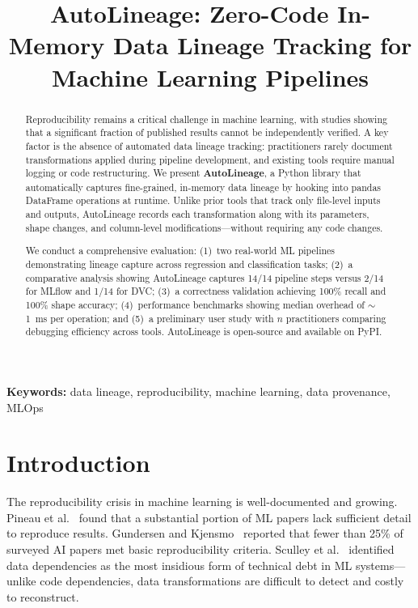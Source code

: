 \documentclass[10pt,twocolumn]{article}
\title{AutoLineage: Zero-Code In-Memory Data Lineage Tracking for Machine Learning Pipelines}
\author{}
\date{}
\begin{document}
\maketitle

\begin{abstract}
Reproducibility remains a critical challenge in machine learning, with studies showing that a significant fraction of published results cannot be independently verified. A key factor is the absence of automated data lineage tracking: practitioners rarely document transformations applied during pipeline development, and existing tools require manual logging or code restructuring. We present \textbf{AutoLineage}, a Python library that automatically captures fine-grained, in-memory data lineage by hooking into pandas DataFrame operations at runtime. Unlike prior tools that track only file-level inputs and outputs, AutoLineage records each transformation along with its parameters, shape changes, and column-level modifications---without requiring any code changes.

We conduct a comprehensive evaluation: (1)~two real-world ML pipelines demonstrating lineage capture across regression and classification tasks; (2)~a comparative analysis showing AutoLineage captures 14/14 pipeline steps versus 2/14 for MLflow and 1/14 for DVC; (3)~a correctness validation achieving 100\% recall and 100\% shape accuracy; (4)~performance benchmarks showing median overhead of $\sim$1~ms per operation; and (5)~a preliminary user study with $n$ practitioners comparing debugging efficiency across tools. AutoLineage is open-source and available on PyPI.
\end{abstract}

\par\noindent\textbf{Keywords:} data lineage, reproducibility, machine learning, data provenance, MLOps

\section{Introduction}
\label{sec:intro}

The reproducibility crisis in machine learning is well-documented and growing. Pineau et al.~\cite{pineau2021} found that a substantial portion of ML papers lack sufficient detail to reproduce results. Gundersen and Kjensmo~\cite{gundersen2018} reported that fewer than 25\% of surveyed AI papers met basic reproducibility criteria. Sculley et al.~\cite{sculley2015} identified data dependencies as the most insidious form of technical debt in ML systems---unlike code dependencies, data transformations are difficult to detect and costly to reconstruct.
\end{document}
